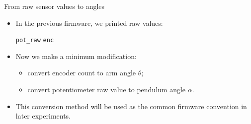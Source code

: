 \documentclass[aspectratio=169]{beamer}
\begin{document}
\begin{frame}{From raw sensor values to angles}

\begin{itemize}
    \item In the previous firmware, we printed raw values:
    \vspace{0.25cm}

    \begin{center}
    \texttt{pot\_raw}  \qquad \texttt{enc}
    \end{center}

    \vspace{0.25cm}

    \item Now we make a minimum modification:
    \vspace{0.15cm}
    \begin{itemize}
        \item convert encoder count to arm angle $\theta$;
        \item convert potentiometer raw value to pendulum angle $\alpha$.
    \end{itemize}

    \vspace{0.25cm}

    \item This conversion method will be used as the common firmware convention in later experiments.
\end{itemize}

\vspace{0.25cm}


\end{frame}
\end{document}
